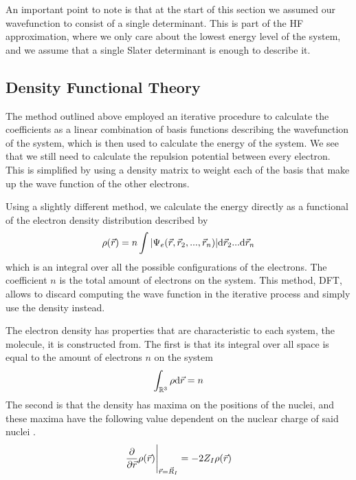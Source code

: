 \documentclass[../master_thesis.tex]{subfiles}
\begin{document}
An important point to note is that at the start of this section we assumed our
wavefunction to consist of a single determinant. This is part of the \ac{HF}
approximation, where we only care about the lowest energy level of the system, and
we assume that a single Slater determinant is enough to describe it.

\subsection{Density Functional Theory}
The method outlined above employed an iterative procedure to calculate the coefficients
as a linear combination of basis functions describing the wavefunction of the
system, which is then used to calculate the energy of the system. We see that we
still need to calculate the repulsion potential between every electron. This is
simplified by using a density matrix to weight each of the basis that make up the
wave function of the other electrons.

Using a slightly different method, we calculate the energy directly as a functional
of the electron density distribution \cite{Sorland, Cramer:2004} described by
\begin{equation}\label{eq:densityintegral}
  \rho(\vec{r}) = n \int\abs{\Psi_e(\vec{r}, \vec{r}_2,..., \vec{r}_n)} \text{d}\vec{r}_2...\text{d}\vec{r}_n
\end{equation}
which is an integral over all the possible configurations of the electrons. The
coefficient $n$ is the total amount of electrons on the system. This method,
\ac{DFT}, allows to discard computing the wave function in the iterative process and
simply use the density instead.

The electron density has properties that are characteristic to each system, the
molecule,  it is constructed from. The first is that its integral over all space
is equal to the amount of electrons $n$ on the system \cite{Cramer:2004}
\begin{equation}
  \int_{\mathbb{R}^3}\rho \text{d}\vec{r} = n
\end{equation}
The second is that the density has maxima on the positions of the nuclei, and
these maxima have the following value dependent on the nuclear charge of said
nuclei \cite{Cramer:2004}.
\begin{equation}
 \frac{\partial}{\partial \vec{r}}\rho(\vec{r})\Bigg|_{\vec{r} = \vec{R}_I} = -2Z_I\rho(\vec{r})
\end{equation}
\end{document}
